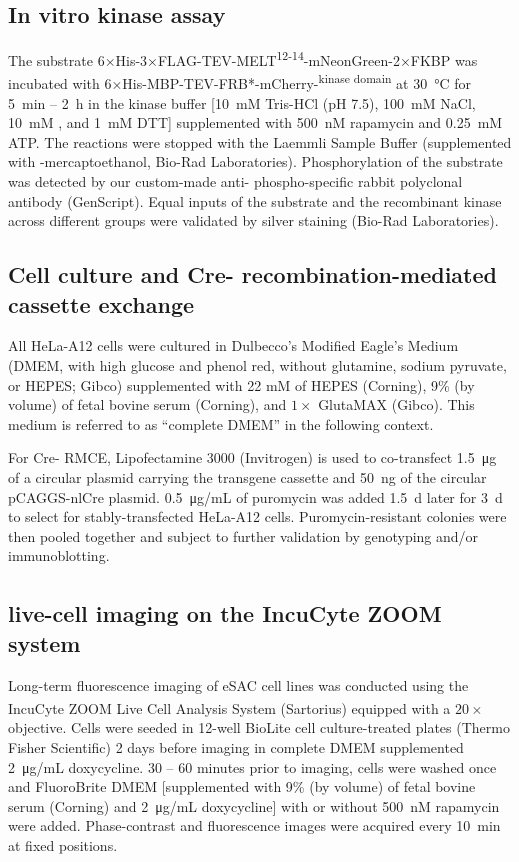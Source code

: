 \subsection{In vitro kinase assay}
The substrate 6×His-3×FLAG-TEV-MELT\textsuperscript{12-14}-mNeonGreen-2×FKBP was incubated with 6×His-MBP-TEV-FRB*-mCherry-\textsuperscript{kinase domain} at \SI{30}{\celsius} for \SI{5}{min} -- \SI{2}{h} in the kinase buffer [\SI{10}{mM} Tris-HCl (pH 7.5), \SI{100}{mM} NaCl, \SI{10}{mM} , and \SI{1}{mM} DTT] supplemented with \SI{500}{nM} rapamycin and \SI{0.25}{mM} ATP. The reactions were stopped with the Laemmli Sample Buffer (supplemented with \textbeta-mercaptoethanol, Bio-Rad Laboratories). Phosphorylation of the substrate was detected by our custom-made anti- phospho-specific rabbit polyclonal antibody (GenScript). Equal inputs of the substrate and the recombinant kinase across different groups were validated by silver staining (Bio-Rad Laboratories).

\subsection{Cell culture and Cre- recombination-mediated cassette exchange}
All HeLa-A12 cells were cultured in Dulbecco's Modified Eagle's Medium (DMEM, with high glucose and phenol red, without glutamine, sodium pyruvate, or HEPES; Gibco) supplemented with 22 mM of HEPES (Corning), 9\% (by volume) of fetal bovine serum (Corning), and $1\times$ GlutaMAX (Gibco). This medium is referred to as ``complete DMEM'' in the following context.

For Cre- RMCE, Lipofectamine 3000 (Invitrogen) is used to co-transfect \SI{1.5}{\micro g} of a circular plasmid carrying the transgene cassette and \SI{50}{ng} of the circular pCAGGS-nlCre plasmid. \SI{0.5}{\micro g/mL} of puromycin was added \SI{1.5}{d} later for \SI{3}{d} to select for stably-transfected HeLa-A12 cells. Puromycin-resistant colonies were then pooled together and subject to further validation by genotyping and/or immunoblotting.

\subsection{live-cell imaging on the IncuCyte\textsuperscript{\textregistered} ZOOM system}
Long-term fluorescence imaging of eSAC cell lines was conducted using the IncuCyte\textsuperscript{\textregistered} ZOOM Live Cell Analysis System (Sartorius) equipped with a $20\times$ objective. Cells were seeded in 12-well BioLite cell culture-treated plates (Thermo Fisher Scientific) 2 days before imaging in complete DMEM supplemented \SI{2}{\micro g/mL} doxycycline. 30 -- 60 minutes prior to imaging, cells were washed once and FluoroBrite\texttrademark{} DMEM [supplemented with 9\% (by volume) of fetal bovine serum (Corning) and \SI{2}{\micro g/mL} doxycycline] with or without \SI{500}{nM} rapamycin were added. Phase-contrast and fluorescence images were acquired every \SI{10}{min} at fixed positions.%